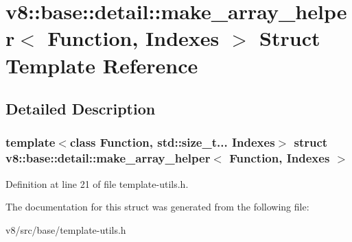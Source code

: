 \hypertarget{structv8_1_1base_1_1detail_1_1make__array__helper}{}\section{v8\+:\+:base\+:\+:detail\+:\+:make\+\_\+array\+\_\+helper$<$ Function, Indexes $>$ Struct Template Reference}
\label{structv8_1_1base_1_1detail_1_1make__array__helper}


\subsection{Detailed Description}
\subsubsection*{template$<$class Function, std\+::size\+\_\+t... Indexes$>$\newline
struct v8\+::base\+::detail\+::make\+\_\+array\+\_\+helper$<$ Function, Indexes $>$}



Definition at line 21 of file template-\/utils.\+h.



The documentation for this struct was generated from the following file\+:\begin{DoxyCompactItemize}
\item 
v8/src/base/template-\/utils.\+h\end{DoxyCompactItemize}
